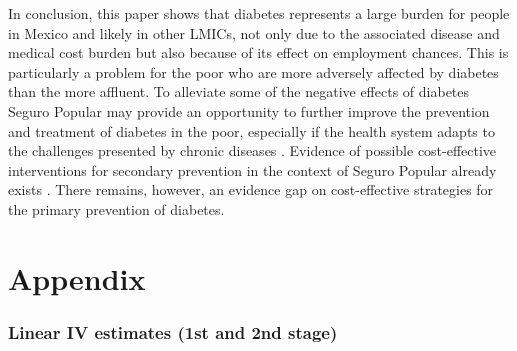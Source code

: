 In conclusion, this paper shows that diabetes represents
a large burden for people in Mexico and likely in other \acp{LMIC},
not only due to the associated disease and medical cost burden but
also because of its effect on employment chances. This is particularly
a problem for the poor who are more adversely affected by diabetes
than the more affluent. To alleviate some of the negative effects
of diabetes Seguro Popular may provide an opportunity to further improve
the prevention and treatment of diabetes in the poor, especially if
the health system adapts to the challenges presented by chronic diseases
\parencite{Samb2010}. Evidence of possible cost-effective interventions
for secondary prevention in the context of Seguro Popular already
exists \parencite{Salomon2012}. There remains, however, an evidence gap
on cost-effective strategies for the primary prevention of diabetes.

\appendix
\clearpage


\part*{Appendix}


\section{\label{sec:Lewbel-and-linear}Linear IV estimates (1st and 2nd stage)}

\setcounter{table}{0} 
\renewcommand{\thetable}{A\arabic{table}}

